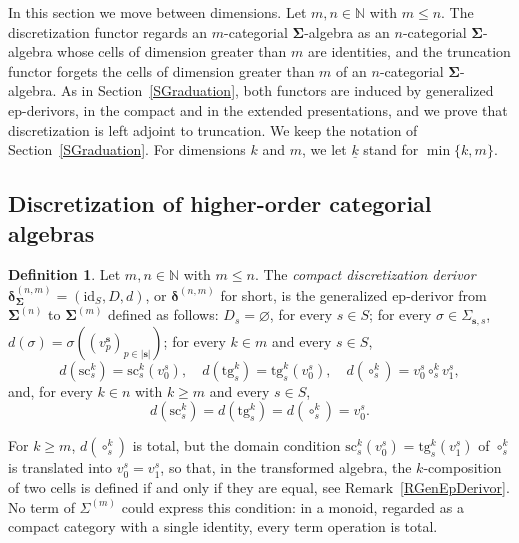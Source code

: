 \documentclass{amsart}
\newcommand{\bb}[1]{\ensuremath{\lvert #1 \rvert}}
\theoremstyle{plain}
\theoremstyle{definition}
\newtheorem{definition}[theorem]{Definition}
\begin{document}
In this section we move between dimensions. Let $m,n\in\mathbb{N}$ with $m\leq n$. The discretization functor regards an $m$-categorial $\mathbf{\Sigma}$-algebra as an $n$-categorial $\mathbf{\Sigma}$-algebra whose cells of dimension greater than $m$ are identities, and the truncation functor forgets the cells of dimension greater than $m$ of an $n$-categorial $\mathbf{\Sigma}$-algebra. As in Section~\ref{SGraduation}, both functors are induced by generalized ep-derivors, in the compact and in the extended presentations, and we prove that discretization is left adjoint to truncation. We keep the notation of Section~\ref{SGraduation}. For dimensions $k$ and $m$, we let $\underline{k}$ stand for $\min\{k,m\}$.

\subsection{Discretization of higher-order categorial algebras}\label{SDiscretization}

\begin{definition}\label{DDiscDerivor}
Let $m,n\in\mathbb{N}$ with $m\leq n$. The \emph{compact discretization derivor} $\boldsymbol{\delta}^{(n,m)}_{\mathbf{\Sigma}}=(\mathrm{id}_{S},D,d)$, or $\boldsymbol{\delta}^{(n,m)}$ for short, is the generalized ep-derivor from $\mathbf{\Sigma}^{(n)}$ to $\mathbf{\Sigma}^{(m)}$ defined as follows: $D_{s}=\varnothing$, for every $s\in S$; for every $\sigma\in\Sigma_{\mathbf{s},s}$, $d(\sigma)=\sigma((v^{\mathbf{s}}_{p})_{p\in\bb{\mathbf{s}}})$; for every $k\in m$ and every $s\in S$,
$$
d(\mathrm{sc}^{k}_{s})=\mathrm{sc}^{k}_{s}(v^{s}_{0}),\quad
d(\mathrm{tg}^{k}_{s})=\mathrm{tg}^{k}_{s}(v^{s}_{0}),\quad
d(\circ^{k}_{s})=v^{s}_{0}\circ^{k}_{s}v^{s}_{1},
$$
and, for every $k\in n$ with $k\geq m$ and every $s\in S$,
$$
d(\mathrm{sc}^{k}_{s})=d(\mathrm{tg}^{k}_{s})=d(\circ^{k}_{s})=v^{s}_{0}.
$$
\end{definition}

For $k\geq m$, $d(\circ^{k}_{s})$ is total, but the domain condition $\mathrm{sc}^{k}_{s}(v^{s}_{0})=\mathrm{tg}^{k}_{s}(v^{s}_{1})$ of $\circ^{k}_{s}$ is translated into $v^{s}_{0}=v^{s}_{1}$, so that, in the transformed algebra, the $k$-composition of two cells is defined if and only if they are equal, see Remark~\ref{RGenEpDerivor}. No term of $\Sigma^{(m)}$ could express this condition: in a monoid, regarded as a compact category with a single identity, every term operation is total.
\end{document}

